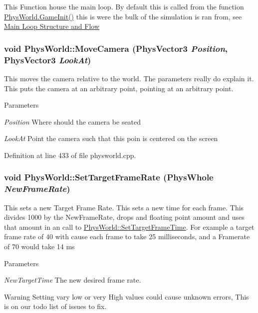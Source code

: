This Function house the main loop. By default this is called from the function \hyperlink{classPhysWorld_afc5116f97cc1e91e899d1a1ca7e14e9b}{PhysWorld.GameInit()} this is were the bulk of the simulation is ran from, see \hyperlink{mainloop1}{Main Loop Structure and Flow} \hypertarget{classPhysWorld_a1df24ee06d5881825902b60e0d81174a}{
\subsubsection[{MoveCamera}]{\setlength{\rightskip}{0pt plus 5cm}void PhysWorld::MoveCamera ({\bf PhysVector3} {\em Position}, \/  {\bf PhysVector3} {\em LookAt})}}
\label{db/df5/classPhysWorld_a1df24ee06d5881825902b60e0d81174a}


This moves the camera relative to the world. The parameters really do explain it. This puts the camera at an arbitrary point, pointing at an arbitrary point. 
\begin{DoxyParams}{Parameters}
\item[{\em Position}]Where should the camera be seated \item[{\em LookAt}]Point the camera such that this poin is centered on the screen \end{DoxyParams}


Definition at line 433 of file physworld.cpp.\hypertarget{classPhysWorld_af68a05d6ee84d901bb3ed0e175daa662}{
\subsubsection[{SetTargetFrameRate}]{\setlength{\rightskip}{0pt plus 5cm}void PhysWorld::SetTargetFrameRate (PhysWhole {\em NewFrameRate})}}
\label{db/df5/classPhysWorld_af68a05d6ee84d901bb3ed0e175daa662}


This sets a new Target Frame Rate. This sets a new time for each frame. This divides 1000 by the NewFrameRate, drops and floating point amount and uses that amount in an call to \hyperlink{classPhysWorld_ab1c6f9286bd97eb502d8b0ddc4954566}{PhysWorld::SetTargetFrameTime}. For example a target frame rate of 40 with cause each frame to take 25 milliseconds, and a Framerate of 70 would take 14 ms 
\begin{DoxyParams}{Parameters}
\item[{\em NewTargetTime}]The new desired frame rate. \end{DoxyParams}
\begin{DoxyWarning}{Warning}
Setting vary low or very High values could cause unknown errors, This is on our todo list of issues to fix. 
\end{DoxyWarning}


